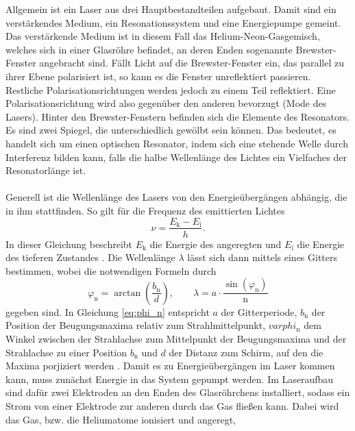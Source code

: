 Allgemein ist ein Laser aus drei Hauptbestandteilen aufgebaut. Damit sind ein 
verstärkendes Medium, ein Resonationssystem und eine Energiepumpe gemeint.
Das verstärkende Medium ist in diesem Fall das Helium-Neon-Gasgemisch, welches sich 
in einer Glasröhre befindet, an deren Enden sogenannte Brewster-Fenster angebracht sind.
Fällt Licht auf die Brewster-Fenster ein, das parallel zu ihrer Ebene polarisiert ist,
so kann es die Fenster unreflektiert passieren. Restliche Polarisationsrichtungen werden jedoch
zu einem Teil reflektiert. Eine Polarisationsrichtung wird also gegenüber den anderen 
bevorzugt (Mode des Lasers). Hinter den Brewster-Fenstern befinden sich die 
Elemente des Resonators. Es sind zwei Spiegel, die unterschiedlich gewölbt sein können.
Das bedeutet, es handelt sich um einen optischen Resonator, indem sich eine 
stehende Welle durch Interferenz bilden kann, falls die halbe Wellenlänge des Lichtes ein 
Vielfaches der Resonatorlänge ist.\\\\
Generell ist die Wellenlänge des Lasers von den Energieübergängen abhängig, die in ihm 
stattfinden. So gilt für die Frequenz des emittierten Lichtes 
\begin{equation}
    \nu = \frac{ E_{\text{k}} - E_{\text{i}} }{h}.
    \label{eq1}
\end{equation}
In dieser Gleichung beschreibt $E_{\text{k}}$ die Energie des angeregten 
und $E_{\text{i}}$ die Energie des tieferen Zustandes \cite{1}.
Die Wellenlänge $\lambda$ lässt sich dann mittels eines Gitters bestimmen, wobei die 
notwendigen Formeln durch
\begin{equation}
    \varphi_{\text{n}}=\arctan{\left(\frac{b_{\text{n}}}{d}\right)},\qquad \lambda = a\cdot\frac{\sin{\left(\varphi_{\text{n}}\right)}}{\text{n}}
    \label{eq:phi_n}
\end{equation}
gegeben sind. In Gleichung \eqref{eq:phi_n} entspricht $a$ der Gitterperiode, $b_{\text{n}}$ der Position der Beugungsmaxima relativ zum Strahlmittelpunkt,
$varphi_{\text{n}}$ dem Winkel zwischen der Strahlachse zum Mittelpunkt der Beugungsmaxima und der Strahlachse zu einer Position $b_{\text{n}}$ und 
$d$ der Distanz zum Schirm, auf den die Maxima porjiziert werden \cite{2}.
Damit es zu Energieübergängen im Laser kommen kann, muss zunächst Energie in das 
System gepumpt werden.
Im Laseraufbau sind dafür zwei Elektroden an den Enden des Glasröhrchens installiert, 
sodass ein Strom von einer Elektrode zur anderen durch das Gas fließen kann.
Dabei wird das Gas, bzw. die Heliumatome ionisiert und angeregt,
